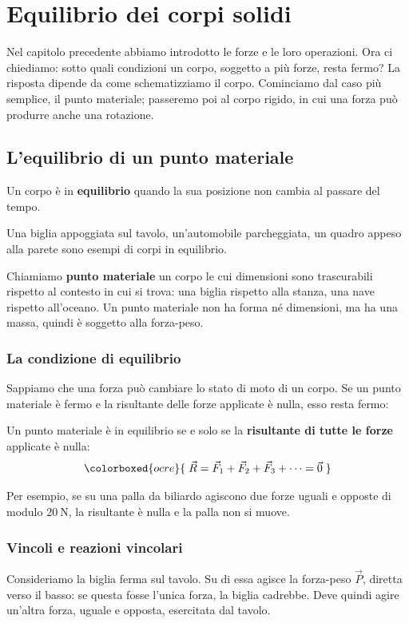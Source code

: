\chapter{Equilibrio dei corpi solidi}

Nel capitolo precedente abbiamo introdotto le forze e le loro operazioni. Ora ci chiediamo: sotto quali condizioni un corpo, soggetto a più forze, resta fermo? La risposta dipende da come schematizziamo il corpo. Cominciamo dal caso più semplice, il punto materiale; passeremo poi al corpo rigido, in cui una forza può produrre anche una rotazione.

\section{L'equilibrio di un punto materiale}

\begin{definizione}
Un corpo è in \textbf{equilibrio} quando la sua posizione non cambia al passare del tempo.
\end{definizione}

Una biglia appoggiata sul tavolo, un'automobile parcheggiata, un quadro appeso alla parete sono esempi di corpi in equilibrio.

Chiamiamo \textbf{punto materiale} un corpo le cui dimensioni sono trascurabili rispetto al contesto in cui si trova: una biglia rispetto alla stanza, una nave rispetto all'oceano. Un punto materiale non ha forma né dimensioni, ma ha una massa, quindi è soggetto alla forza-peso.

\subsection{La condizione di equilibrio}
Sappiamo che una forza può cambiare lo stato di moto di un corpo. Se un punto materiale è fermo e la risultante delle forze applicate è nulla, esso resta fermo:

\begin{definizione}
Un punto materiale è in equilibrio se e solo se la \textbf{risultante di tutte le forze} applicate è nulla:
\[
\colorboxed{ocre}{\; \vec{R} = \vec{F}_1 + \vec{F}_2 + \vec{F}_3 + \dots = \vec{0} \;}
\]
\end{definizione}

Per esempio, se su una palla da biliardo agiscono due forze uguali e opposte di modulo $\SI{20}{\newton}$, la risultante è nulla e la palla non si muove.

\subsection{Vincoli e reazioni vincolari}
Consideriamo la biglia ferma sul tavolo. Su di essa agisce la forza-peso $\vec{P}$, diretta verso il basso: se questa fosse l'unica forza, la biglia cadrebbe. Deve quindi agire un'altra forza, uguale e opposta, esercitata dal tavolo.

